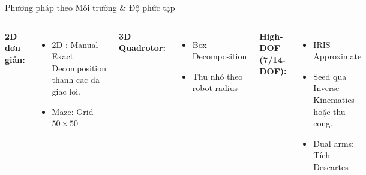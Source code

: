 \documentclass[aspectratio=169]{beamer}
\begin{document}
\begin{frame}{Phương pháp theo Môi trường \& Độ phức tạp}

    \begin{columns}[c]

        \textbf{2D đơn giản:}
        \begin{itemize}
            \item 2D : Manual Exact Decomposition thanh cac da giac loi.
            \item Maze: Grid $50 \times 50$
        \end{itemize}
    
        \vspace{0.8em}
        \textbf{3D Quadrotor:}
        \begin{itemize}
            \item Box Decomposition
            \item Thu nhỏ theo robot radius
        \end{itemize}
    
        \vspace{0.8em}
        \textbf{High-DOF (7/14-DOF):}
        \begin{itemize}
            \item IRIS Approximate
            \item Seed qua Inverse Kinematics hoặc thu cong.
            \item Dual arms: Tích Descartes
        \end{itemize}

        \includegraphics[width=\textwidth]{../imgs/2d-decompose-ex.png}
        
    \end{columns}

\end{frame}
\end{document}
